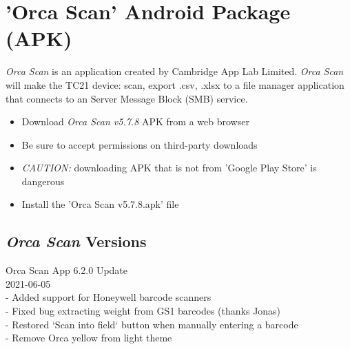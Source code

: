 \documentclass[a4paper]{article}
\newcommand{\test}{
	\lstset{ %
		language=R,                     %
		basicstyle=\footnotesize,       %
		numbers=left,                   %
		numberstyle=\tiny\color{gray},  %
		stepnumber=1,                   %
		numbersep=5pt,                  %
		backgroundcolor=\color{white},  %
		showspaces=false,               %
		showstringspaces=false,         %
		showtabs=false,                 %
		frame=single,                   %
		rulecolor=\color{black},        %
		tabsize=2,                      %
		captionpos=b,                   %
		breaklines=true,                %
		breakatwhitespace=false,        %
		title=\lstname,                 %
		keywordstyle=\color{blue},      %
		commentstyle=\color{darkgreen},   %
		stringstyle=\color{red},      %
		escapeinside={\%*}{*)},         %
		morekeywords={*,...}          %
}}
\begin{document}
	\section{'Orca Scan' Android Package (APK)}
	\begin{scriptsize}
		\emph{Orca Scan} is an application created by Cambridge App Lab Limited. \emph{Orca Scan} will make the TC21 device: scan, export .csv, .xlsx to a file manager application that connects to an Server Message Block (SMB) service.
		
		\begin{itemize}
			\item Download \emph{Orca Scan v5.7.8} APK from a web browser
			\item Be sure to accept permissions on third-party downloads
			\item \emph{CAUTION:} downloading APK that is not from 'Google Play Store' is dangerous
			\item Install the 'Orca Scan v5.7.8.apk' file
		\end{itemize}
		\subsection*{\emph{Orca Scan} Versions}
			Orca Scan App 6.2.0 Update
			\\  2021-06-05
			\\- Added support for Honeywell barcode scanners
			\\- Fixed bug extracting weight from GS1 barcodes (thanks Jonas)
			\\- Restored `Scan into field` button when manually entering a barcode
			\\- Remove Orca yellow from light theme
			
	\end{scriptsize}
%			
%			
\end{document}
